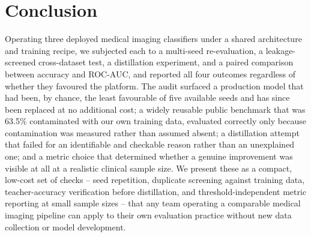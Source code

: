 \documentclass[conference]{IEEEtran}
\begin{document}
\section{Conclusion}

Operating three deployed medical imaging classifiers under a shared architecture and training recipe, we subjected each to a multi-seed re-evaluation, a leakage-screened cross-dataset test, a distillation experiment, and a paired comparison between accuracy and ROC-AUC, and reported all four outcomes regardless of whether they favoured the platform. The audit surfaced a production model that had been, by chance, the least favourable of five available seeds and has since been replaced at no additional cost; a widely reusable public benchmark that was 63.5\% contaminated with our own training data, evaluated correctly only because contamination was measured rather than assumed absent; a distillation attempt that failed for an identifiable and checkable reason rather than an unexplained one; and a metric choice that determined whether a genuine improvement was visible at all at a realistic clinical sample size. We present these as a compact, low-cost set of checks -- seed repetition, duplicate screening against training data, teacher-accuracy verification before distillation, and threshold-independent metric reporting at small sample sizes -- that any team operating a comparable medical imaging pipeline can apply to their own evaluation practice without new data collection or model development.
\end{document}

